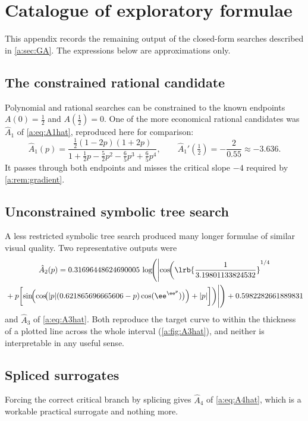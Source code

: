 \section{Catalogue of exploratory formulae}
\label{a:app:catalogue}

This appendix records the remaining output of the closed-form searches described in
\cref{a:sec:GA}. The expressions below are approximations only.

\subsection*{The constrained rational candidate}

Polynomial and rational searches can be constrained to the known endpoints
$A(0)=\tfrac12$ and $A(\tfrac12)=0$. One of the more economical rational candidates
was $\hat A_1$ of \cref{a:eq:A1hat}, reproduced here for comparison:
\begin{equation*}
\hat A_1(p) = \frac{\tfrac12(1-2p)(1+2p)}
{1+\tfrac12p-\tfrac52p^2-\tfrac65p^3+\tfrac65p^4},
\qquad
\hat A_1'(\tfrac12) = -\frac{2}{0.55}\approx-3.636 .
\end{equation*}
It passes through both endpoints and misses the critical slope $-4$ required by
\cref{a:rem:gradient}.

\subsection*{Unconstrained symbolic tree search}

A less restricted symbolic tree search produced many longer formulae of similar
visual quality. Two representative outputs were
\begin{multline}
\label{a:eq:A2hat}
\hat A_2(p)
= 0.31696448624690005\,
\log\!\Biggl(
\Biggl|\cos\!\biggl(
\lrb{\frac{1}{3.19801133824532}}^{1/4}\\
{}+p\biggl[
\sin\!\Bigl(
\cos\!\bigl(|p|(0.621865696665606-p)\cos(\ee^{\ee^{p}})\bigr)
\Bigr)+|p|
\biggr]\biggr)\Biggr|
\Biggr)
+ 0.5982282661889831
\end{multline}
and $\hat A_3$ of \cref{a:eq:A3hat}. Both reproduce the target curve to within the
thickness of a plotted line across the whole interval (\cref{a:fig:A3hat}), and
neither is interpretable in any useful sense.

\subsection*{Spliced surrogates}

Forcing the correct critical branch by splicing gives $\hat A_4$ of
\cref{a:eq:A4hat}, which is a workable practical surrogate and nothing more.

\renewcommand{\thesection}{\thechapter.\arabic{section}}

